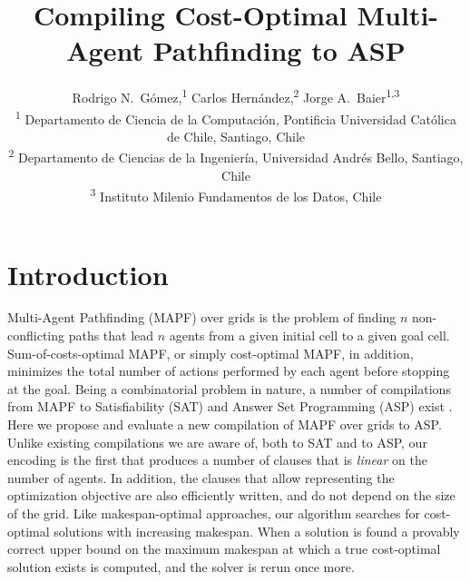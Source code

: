 \documentclass[letterpaper]{article} %
\title{Compiling Cost-Optimal Multi-Agent Pathfinding to ASP}
\author{Rodrigo N.\ G\'omez,\textsuperscript{\rm 1}  Carlos Hern\'andez,\textsuperscript{\rm 2}  Jorge A.\ Baier\textsuperscript{\rm 1,3} \\
\textsuperscript{\rm 1} Departamento de Ciencia de la Computaci\'on, Pontificia Universidad Cat\'olica de Chile, Santiago, Chile \\
\textsuperscript{\rm 2} Departamento de Ciencias de la Ingenier\'ia, Universidad Andr\'es Bello, Santiago, Chile\\
\textsuperscript{\rm 3} Instituto Milenio Fundamentos de los Datos, Chile}
\begin{document}
\maketitle


\section{Introduction}
Multi-Agent Pathfinding (MAPF) over grids is the problem of finding $n$ non-conflicting paths that lead $n$ agents from a given initial cell to a given goal cell. Sum-of-costs-optimal MAPF, or simply cost-optimal MAPF, in addition, minimizes the total number of actions performed by each agent before stopping at the goal. Being a combinatorial problem in nature, a number of compilations from MAPF to Satisfiability (SAT) \cite{SurynekFSB16} and Answer Set Programming (ASP) exist \cite{ErdemKOS13,GebserOOS18}. Here we propose and evaluate a new compilation of MAPF over grids to ASP. Unlike existing compilations we are aware of, both to SAT and to ASP, our encoding is the first that produces a number of clauses that is \emph{linear} on the number of agents. In addition, the clauses that allow representing the optimization objective are also efficiently written, and do not depend on the size of the grid. Like makespan-optimal approaches, our algorithm searches for cost-optimal solutions with increasing makespan. When a solution is found a provably correct upper bound on the maximum makespan at which a true cost-optimal solution exists is computed, and the solver is rerun once more.
\end{document}
